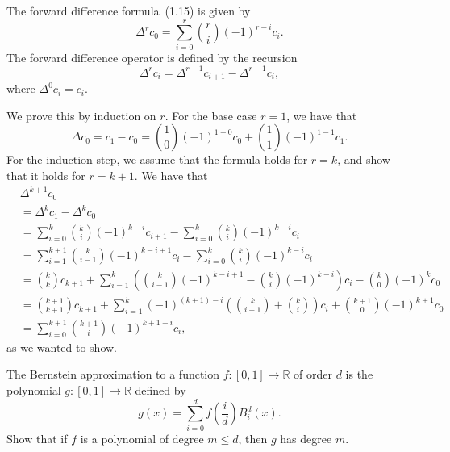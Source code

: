 \begin{solution}
    The forward difference formula~(1.15) is given by
    \begin{equation*}
        \Delta^r c_0 = \sum_{i = 0}^r \binom{r}{i} (-1)^{r-i} c_i.
    \end{equation*}
    The forward difference operator is defined by the recursion
    \begin{equation*}
        \Delta^r c_i = \Delta^{r-1} c_{i+1} - \Delta^{r-1} c_i,
    \end{equation*}
    where $\Delta^0 c_i = c_i$.

    We prove this by induction on $r$.
    For the base case $r = 1$, we have that
    \begin{equation*}
        \Delta c_0 = c_1 - c_0 = \binom{1}{0} (-1)^{1-0} c_0 + \binom{1}{1} (-1)^{1-1} c_1.
    \end{equation*}
    For the induction step, we assume that the formula holds for $r = k$, and show that it holds for $r = k + 1$.
    We have that
    \begin{align*}
        &\Delta^{k+1} c_0 \\
        &= \Delta^k c_1 - \Delta^k c_0 \\
        &= \sum_{i = 0}^k \binom{k}{i} (-1)^{k-i} c_{i+1} - \sum_{i = 0}^k \binom{k}{i} (-1)^{k-i} c_i \\
        &= \sum_{i = 1}^{k+1} \binom{k}{i-1} (-1)^{k-i+1} c_i - \sum_{i = 0}^k \binom{k}{i} (-1)^{k-i} c_i \\
        &= \binom{k}{k} c_{k+1} + \sum_{i = 1}^k \left(
            \binom{k}{i-1} (-1)^{k-i+1} - \binom{k}{i} (-1)^{k-i}
        \right) c_i - \binom{k}{0} (-1)^{k} c_0 \\
        &= \binom{k+1}{k+1} c_{k+1} + \sum_{i = 1}^k (-1)^{(k+1)-i} \left(
            \binom{k}{i-1} + \binom{k}{i}
        \right) c_i + \binom{k+1}{0} (-1)^{k+1} c_0 \\
        &= \sum_{i = 0}^{k+1} \binom{k+1}{i} (-1)^{k+1-i} c_i,
    \end{align*}
    as we wanted to show.
\end{solution}

\begin{exercise}
    The Bernstein approximation to a function $f : [0, 1] \to \mathbb{R}$ of order $d$ is the polynomial $g : [0, 1] \to \mathbb{R}$ defined by
    \begin{equation*}
        g(x) = \sum_{i = 0}^d f\left(\frac{i}{d}\right) B_i^d(x).
    \end{equation*}
    Show that if $f$ is a polynomial of degree $m \leq d$, then $g$ has degree $m$.
\end{exercise}

